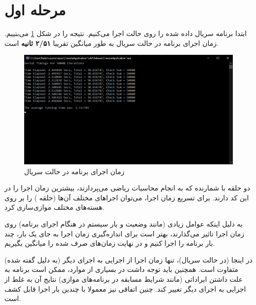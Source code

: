\documentclass{HW}
\begin{document}
\pagestyle{pages}
\thispagestyle{first_page}

\section{مرحله اول}

ابتدا برنامه سریال داده شده را روی حالت  اجرا می‌کنیم. نتیجه را در شکل
\ref{fig:serial}
می‌بنییم. زمان اجرای برنامه در حالت سریال به طور میانگین تقریبا
\textbf{۲/۵۱ ثانیه}
است.

\begin{figure}[ht!]
\begin{center}
	\includegraphics[width=15cm]{images/serial}
\end{center}
\caption{زمان اجرای برنامه در حالت سریال}
\label{fig:serial}
\end{figure}

\begin{question}
دو حلقه با شمارنده  که به انجام محاسبات ریاضی می‌پردازند، بیشترین زمان اجرا را در این کد دارند. برای تسریع زمان اجرا، می‌توان اجراهای مختلف آن‌ها (حلقه ) را بر روی هسته‌های مختلف موازی‌سازی کرد.
\end{question}

\begin{question}
به دلیل اینکه عوامل زیادی (مانند وضعیت و بار سیستم در هنگام اجرای برنامه) روی زمان اجرا تاثیر می‌گذارند، بهتر است برای اندازه‌گیری زمان اجرا به جای یک بار، چند بار برنامه را اجرا کنیم و در نهایت زمان‌های صرف شده را میانگین بگیریم.

در اینجا (در حالت سریال)، تنها زمان اجرا از اجرایی به اجرای دیگر (به دلیل گفته شده) متفاوت است. همچنین باید توجه داشت در بسیاری از موارد، ممکن است برنامه به علت داشتن ایراداتی (مانند شرایط مسابقه در برنامه‌های موازی) نتایج آن به غلط از اجرایی به اجرای دیگر تغییر کند. چنین اتفاقی نیز معمولا با چندین بار اجرا قابل کشف است.
\end{question}
\end{document}
